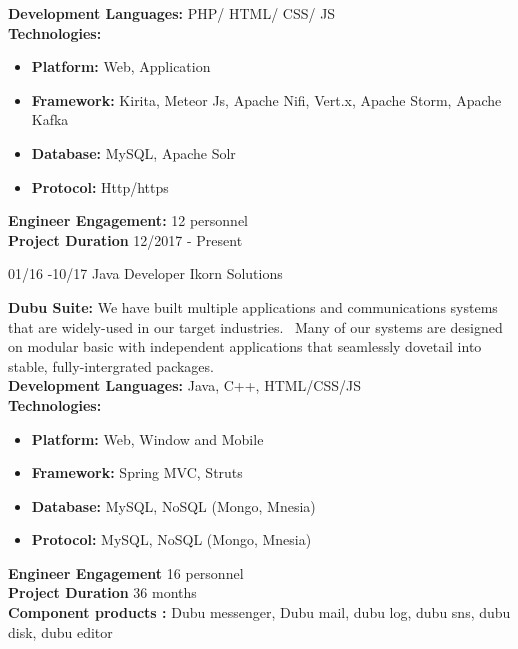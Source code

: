 \documentclass[]{friggeri-cv}
\begin{document}
\begin{entrylist}
\entry
{}
{}
{}
	{ \textbf{Development Languages:} PHP/ HTML/ CSS/ JS~\\
	 \textbf{Technologies:}~
			\begin{itemize}
				\item \textbf{Platform:}  Web, Application
				\item \textbf{Framework:} Kirita, Meteor Js, Apache Nifi,  Vert.x, Apache Storm, Apache Kafka  
				\item \textbf{Database:} MySQL, Apache Solr
				\item \textbf{Protocol:} Http/https
			\end{itemize}
	 \textbf{Engineer Engagement:} 12 personnel\\
	 \textbf{Project Duration} 12/2017 - Present~
	}
\end{entrylist}

\begin{entrylist}
  \entry
    {01/16 -10/17}
    {Java Developer}
    {Ikorn Solutions}
   {\textbf{ Dubu Suite:} We have built multiple applications and communications systems that are widely-used in our target industries.~
	 Many of our systems are designed on modular basic with independent applications that seamlessly dovetail into stable, fully-intergrated packages.\\

	 \textbf{Development Languages:} Java, C++, HTML/CSS/JS\\
	 \textbf{Technologies:}~
			\begin{itemize}
				\item \textbf{Platform:} Web, Window and Mobile
				\item \textbf{Framework:} Spring MVC, Struts
				\item \textbf{Database:} MySQL, NoSQL (Mongo, Mnesia)
				\item \textbf{Protocol:} MySQL, NoSQL (Mongo, Mnesia)
			\end{itemize}
		 \textbf{Engineer Engagement} 16 personnel\\
		 \textbf{Project Duration} 36 months\\
		 \textbf{Component products :} Dubu messenger, Dubu mail, dubu log, dubu sns, dubu disk, dubu editor\\
}
\end{entrylist}
\end{document}
